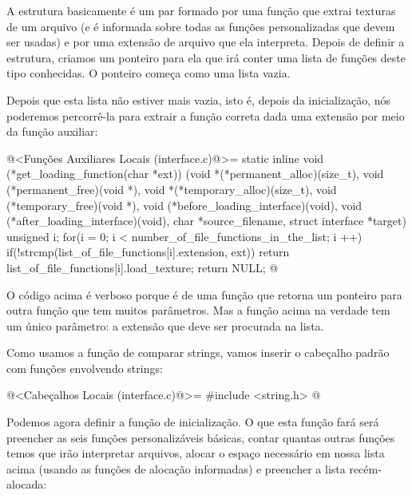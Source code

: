 A estrutura basicamente é um par formado por uma função que extrai
texturas de um arquivo (e é informada sobre todas as funções
personalizadas que devem ser usadas) e por uma extensão de arquivo que
ela interpreta. Depois de definir a estrutura, criamos um ponteiro
para ela que irá conter uma lista de funções deste tipo conhecidas. O
ponteiro começa como uma lista vazia.

Depois que esta lista não estiver mais vazia, isto é, depois da
inicialização, nós poderemos percorrê-la para extrair a função correta
dada uma extensão por meio da função auxiliar:

\iniciocodigo
@<Funções Auxiliares Locais (interface.c)@>=
static inline void (*get_loading_function(char *ext))
                          (void *(*permanent_alloc)(size_t),
                           void (*permanent_free)(void *),
                           void *(*temporary_alloc)(size_t),
                           void (*temporary_free)(void *),
                           void (*before_loading_interface)(void),
                           void (*after_loading_interface)(void),
                           char *source_filename, struct interface *target){
  unsigned i;
  for(i = 0; i < number_of_file_functions_in_the_list; i ++){
    if(!strcmp(list_of_file_functions[i].extension, ext)){
      return list_of_file_functions[i].load_texture;
    }
  }
  return NULL;
}
@
\fimcodigo

O código acima é verboso porque é de uma função que retorna um
ponteiro para outra função que tem muitos parâmetros. Mas a função
acima na verdade tem um único parâmetro: a extensão que deve ser
procurada na lista.

Como usamos a função de comparar strings, vamos inserir o cabeçalho
padrão com funções envolvendo strings:

\iniciocodigo
@<Cabeçalhos Locais (interface.c)@>=
#include <string.h>
@
\fimcodigo

Podemos agora definir a função de inicialização. O que esta função
fará será preencher as seis funções personalizáveis básicas, contar
quantas outras funções temos que irão interpretar arquivos, alocar o
espaço necessário em nossa lista acima (usando as funções de alocação
informadas) e preencher a lista recém-alocada:

